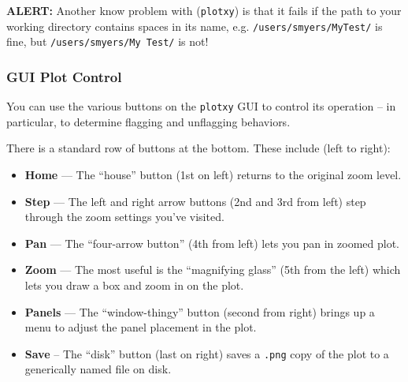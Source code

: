 {\bf ALERT:} Another know problem with ({\tt plotxy}) is that it
fails if the path to your working directory contains spaces in
its name, e.g. {\tt /users/smyers/MyTest/} is fine, but 
{\tt /users/smyers/My\ Test/} is not!



\subsubsection{GUI Plot Control}
\label{section:edit.plot.plotxy.control}

You can use the various buttons on the {\tt plotxy} GUI to control
its operation -- in particular, to determine flagging and unflagging
behaviors.

There is a standard row of buttons at the bottom.  These include
(left to right):
\begin{itemize}
\item {\bf Home} --- The ``house'' button (1st on left) returns to
  the original zoom level.
\item {\bf Step} --- The left and right arrow buttons (2nd and 3rd
  from left) step through the zoom settings you've visited.
\item {\bf Pan} --- The ``four-arrow button'' (4th from left) lets you pan
  in zoomed plot.
\item {\bf Zoom} --- The most useful is the ``magnifying glass'' (5th
  from the left) which lets you draw a box and zoom in on the plot.  
\item {\bf Panels} --- The ``window-thingy'' button (second from
  right) brings up a menu to adjust the panel placement in the plot.
\item {\bf Save} -- The ``disk'' button (last on right) saves a
  {\tt .png} copy of the plot to a generically named file on disk.
\end{itemize}

